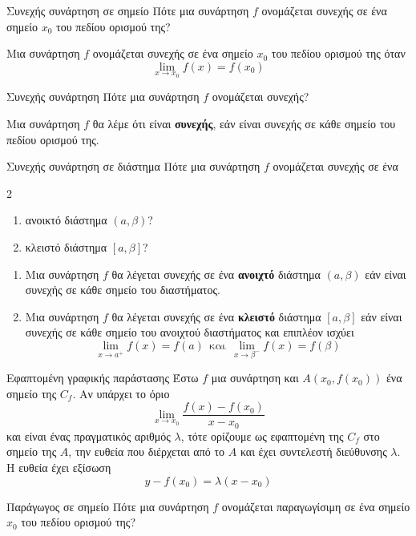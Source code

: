 \begin{Orismosbox}{Συνεχής συνάρτηση σε σημείο}
\label{orismos:synechhs_se_shmeio}
Πότε μια συνάρτηση $f$ ονομάζεται συνεχής σε ένα σημείο $x_0$ του πεδίου ορισμού της?
\end{Orismosbox}
\apanthsh
Μια συνάρτηση $ f $ ονομάζεται συνεχής σε ένα σημείο $ x_0 $ του πεδίου ορισμού της όταν  \[ \lim_{x\rightarrow x_0}{f(x)}=f(x_0) \]
\begin{Orismosbox}{Συνεχής συνάρτηση}
\label{orismos:synechhs_synarthsh}
Πότε μια συνάρτηση $f$ ονομάζεται συνεχής?
\end{Orismosbox}
\apanthsh
Μια συνάρτηση $ f $ θα λέμε ότι είναι \textbf{συνεχής}, εάν είναι συνεχής σε κάθε σημείο του πεδίου ορισμού της.
\begin{Orismosbox}{Συνεχής συνάρτηση σε διάστημα}
\label{orismos:synechhs_se_diasthma}
Πότε μια συνάρτηση $f$ ονομάζεται συνεχής σε ένα 
\begin{multicols}{2}
\begin{enumerate}
\item ανοικτό διάστημα $(a,\beta)$?
\item κλειστό διάστημα $[a,\beta]$?
\end{enumerate}
\end{multicols}
\end{Orismosbox}
\apanthsh
\vspace{-7mm}
\begin{enumerate}
\item Μια συνάρτηση $ f $ θα λέγεται συνεχής σε ένα \textbf{ανοιχτό} διάστημα $ (a,\beta) $ εάν είναι συνεχής σε κάθε σημείο του διαστήματος.
\item Μια συνάρτηση $ f $ θα λέγεται συνεχής σε ένα \textbf{κλειστό} διάστημα $ [a,\beta] $ εάν είναι συνεχής σε κάθε σημείο του ανοιχτού διαστήματος και επιπλέον ισχύει
\[ \lim_{x\to a^+}{f(x)}=f(a)\ \ \textrm{και}\ \ \lim_{x\to\beta^-}{f(x)}=f(\beta) \]
\end{enumerate}
\begin{Orismosbox}{Εφαπτομένη γραφικής παράστασης}
\label{orismos:efaptomenh_grafikhs_parastashs}
Έστω $f$ μια συνάρτηση και $A(x_0,f(x_0))$ ένα σημείο της $C_f$. Αν υπάρχει το όριο \[\lim_{x\to x_0}{\frac{f(x)-f(x_0)}{x-x_0}}\]
και είναι ένας πραγματικός αριθμός $\lambda$, τότε ορίζουμε ως εφαπτομένη της $C_f$ στο σημείο της $A$, την ευθεία που διέρχεται από το $A$ και έχει συντελεστή διεύθυνσης $\lambda$. Η ευθεία έχει εξίσωση
\[ y-f(x_0)=\lambda(x-x_0) \]
\end{Orismosbox}
\begin{Orismosbox}{Παράγωγος σε σημείο}
\label{orismos:paragwgos_se_shmeio}
Πότε μια συνάρτηση $f$ ονομάζεται παραγωγίσιμη σε ένα σημείο $x_0$ του πεδίου ορισμού της?
\end{Orismosbox}
